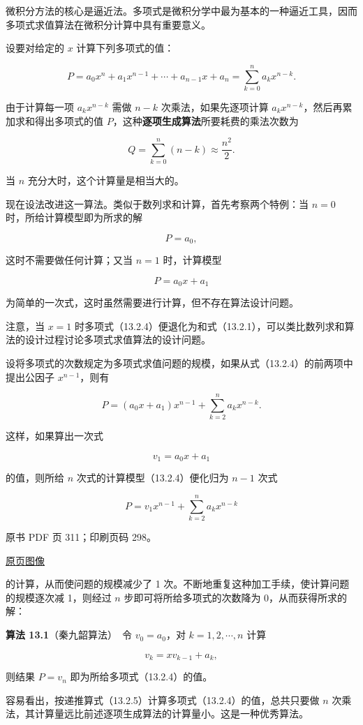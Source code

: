 微积分方法的核心是逼近法。多项式是微积分学中最为基本的一种逼近工具，因而多项式求值算法在微积分计算中具有重要意义。

设要对给定的 \(x\) 计算下列多项式的值：

\[
P=a_0x^n+a_1x^{n-1}+\cdots+a_{n-1}x+a_n
=\sum_{k=0}^{n}a_kx^{n-k}.
\tag{13.2.4}
\]

由于计算每一项 \(a_kx^{n-k}\) 需做 \(n-k\) 次乘法，如果先逐项计算 \(a_kx^{n-k}\)，然后再累加求和得出多项式的值 \(P\)，这种\textbf{逐项生成算法}所要耗费的乘法次数为

\[
Q=\sum_{k=0}^{n}(n-k)\approx\frac{n^2}{2}.
\]

当 \(n\) 充分大时，这个计算量是相当大的。

现在设法改进这一算法。类似于数列求和计算，首先考察两个特例：当 \(n=0\) 时，所给计算模型即为所求的解

\[
P=a_0,
\]

这时不需要做任何计算；又当 \(n=1\) 时，计算模型

\[
P=a_0x+a_1
\]

为简单的一次式，这时虽然需要进行计算，但不存在算法设计问题。

注意，当 \(x=1\) 时多项式（13.2.4）便退化为和式（13.2.1），可以类比数列求和算法的设计过程讨论多项式求值算法的设计问题。

设将多项式的次数规定为多项式求值问题的规模，如果从式（13.2.4）的前两项中提出公因子 \(x^{n-1}\)，则有

\[
P=(a_0x+a_1)x^{n-1}+\sum_{k=2}^{n}a_kx^{n-k}.
\]

这样，如果算出一次式

\[
v_1=a_0x+a_1
\]

的值，则所给 \(n\) 次式的计算模型（13.2.4）便化归为 \(n-1\) 次式

\[
P=v_1x^{n-1}+\sum_{k=2}^{n}a_kx^{n-k}
\]

\clearpage

原书 PDF 页 311；印刷页码 298。

\href{source-images/pdf-311.jpeg}{原页图像}

的计算，从而使问题的规模减少了 1 次。不断地重复这种加工手续，使计算问题的规模逐次减 1，则经过 \(n\) 步即可将所给多项式的次数降为 0，从而获得所求的解：

\textbf{算法 13.1}（秦九韶算法）　令 \(v_0=a_0\)，对 \(k=1,2,\cdots,n\) 计算

\[
v_k=xv_{k-1}+a_k,
\tag{13.2.5}
\]

则结果 \(P=v_n\) 即为所给多项式（13.2.4）的值。

容易看出，按递推算式（13.2.5）计算多项式（13.2.4）的值，总共只要做 \(n\) 次乘法，其计算量远比前述逐项生成算法的计算量小。这是一种优秀算法。

